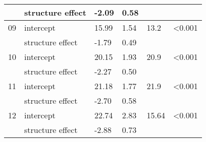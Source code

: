 \documentclass{article}
\begin{document}
\begin{table}[ht]
\begin{tabular}{|p{}|p{}|p{}p{}p{}p{}|}
    & structure effect & -2.09 & 0.58 &  &  \\ 
   \hline
09 & intercept & 15.99 & 1.54 & 13.2 & <0.001 \\ 
    & structure effect & -1.79 & 0.49 &  &  \\ 
   \hline
10 & intercept & 20.15 & 1.93 & 20.9 & <0.001 \\ 
    & structure effect & -2.27 & 0.50 &  &  \\ 
   \hline
11 & intercept & 21.18 & 1.77 & 21.9 & <0.001 \\ 
    & structure effect & -2.70 & 0.58 &  &  \\ 
   \hline
12 & intercept & 22.74 & 2.83 & 15.64 & <0.001 \\ 
    & structure effect & -2.88 & 0.73 &  &  \\ 
   \hline
\end{tabular}
\endgroup
\end{table}\clearpage
\end{document}

